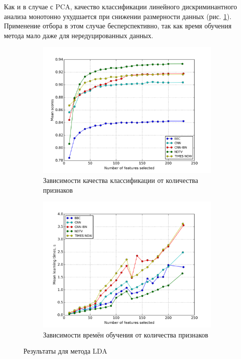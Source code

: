 \par
Как и в случае с PCA, качество классификации линейного дискриминантного анализа монотонно ухудшается при снижении размерности данных (рис. \ref{fig:lda_rfs}). Применение отбора в этом случае бесперспективно, так как время обучения метода мало даже для нередуцированных данных.

\begin{figure}[h!]
    \centering
	\begin{subfigure}{0.45\textwidth}
		\includegraphics[width=\textwidth]{images/RFS-LDA.png}
		\caption{Зависимости качества классификации от количества признаков}
	\end{subfigure}
	\begin{subfigure}{0.45\textwidth}
		\includegraphics[width=\textwidth]{images/RFS-LDATime.png}
		\caption{Зависимости времён обучения от количества признаков}
	\end{subfigure}
	\caption{Результаты для метода LDA}\label{fig:lda_rfs}
\end{figure}

